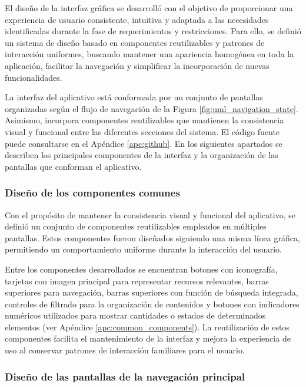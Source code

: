         El diseño de la interfaz gráfica se desarrolló con el objetivo de proporcionar una experiencia de usuario consistente, intuitiva y adaptada a las necesidades identificadas durante la fase de requerimientos y restricciones. Para ello, se definió un sistema de diseño basado en componentes reutilizables y patrones de interacción uniformes, buscando mantener una apariencia homogénea en toda la aplicación, facilitar la navegación y simplificar la incorporación de nuevas funcionalidades.

        La interfaz del aplicativo está conformada por un conjunto de pantallas organizadas según el flujo de navegación de la Figura \ref{fig:uml_navigation_state}. Asimismo, incorpora componentes reutilizables que mantienen la consistencia visual y funcional entre las diferentes secciones del sistema. El código fuente puede consultarse en el Apéndice \ref{apc:github}. En los siguientes apartados se describen los principales componentes de la interfaz y la organización de las pantallas que conforman el aplicativo.

        \subsubsection{Diseño de los componentes comunes}

            Con el propósito de mantener la consistencia visual y funcional del aplicativo, se definió un conjunto de componentes reutilizables empleados en múltiples pantallas. Estos componentes fueron diseñados siguiendo una misma línea gráfica, permitiendo un comportamiento uniforme durante la interacción del usuario.

            Entre los componentes desarrollados se encuentran botones con iconografía, tarjetas con imagen principal para representar recursos relevantes, barras superiores para navegación, barras superiores con función de búsqueda integrada, controles de filtrado para la organización de contenidos y botones con indicadores numéricos utilizados para mostrar cantidades o estados de determinados elementos (ver Apéndice \ref{apc:common_components}). La reutilización de estos componentes facilita el mantenimiento de la interfaz y mejora la experiencia de uso al conservar patrones de interacción familiares para el usuario.

        \subsubsection{Diseño de las pantallas de la navegación principal}

